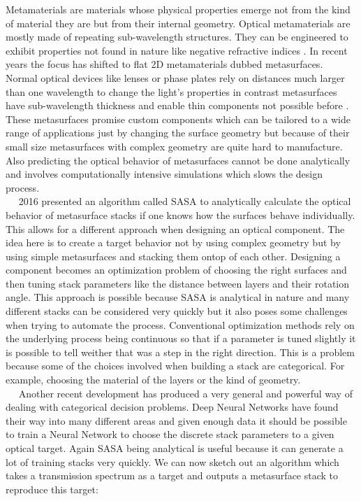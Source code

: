 Metamaterials are materials whose physical properties emerge not from the kind of material they are but from their internal geometry. Optical metamaterials are mostly made of repeating sub-wavelength structures. They can be engineered to exhibit properties not found in nature like negative refractive indices \cite{Shelby2001}. In recent years the focus has shifted to flat 2D metamaterials dubbed metasurfaces. Normal optical devices like lenses or phase plates rely on distances much larger than one wavelength to change the light's properties in contrast metasurfaces have sub-wavelength thickness and enable thin components not possible before \cite{Yu2014}.  These metasurfaces promise custom components which can be tailored to a wide range of applications just by changing the surface geometry
but because of their small size metasurfaces with complex geometry are quite hard to manufacture. Also predicting the optical behavior of metasurfaces cannot be done analytically and involves computationally intensive simulations which slows the design process. 
\\

$\quad$
2016 \cite{Menzel2016} presented an algorithm called SASA to analytically calculate the optical behavior of metasurface stacks if one knows how the surfaces behave individually. This allows for a different approach when designing an optical component. The idea here is to create a target behavior not by using complex geometry but by using simple metasurfaces and stacking them ontop of each other. Designing a component becomes an optimization problem of choosing the right surfaces and then tuning stack parameters like the distance between layers and their rotation angle. This approach is possible because SASA is analytical in nature and many different stacks can be considered very quickly but it also poses some challenges when trying to automate the process. Conventional optimization methods rely on the underlying process being continuous so that if a parameter is tuned slightly it is possible to tell weither that was a step in the right direction. This is a problem because some of the choices involved when building a stack are categorical. For example, choosing the material of the layers or the kind of geometry.
\\

$\quad$
Another recent development has produced a very general and powerful way of dealing with categorical decision problems. Deep Neural Networks have found their way into many different areas and given enough data it should be possible to train a Neural Network to choose the discrete stack parameters to a given optical target. Again SASA being analytical is useful because it can generate a lot of training stacks very quickly. We can now sketch out an algorithm which takes a transmission spectrum as a target and outputs a metasurface stack to reproduce this target:
\\
\\


